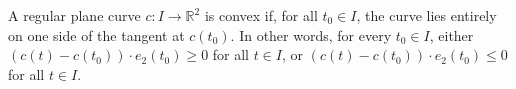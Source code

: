 A regular plane curve $c: I \to \mathbb{R}^2$ is convex if, for all $t_0 \in I$, the curve lies entirely on one side of the tangent at $c(t_0)$. In other words, for every $t_0 \in I$, either $(c(t) - c(t_0)) \cdot e_2(t_0) \geq 0$ for all $t \in I$, or $(c(t) - c(t_0)) \cdot e_2(t_0) \leq 0$ for all $t \in I$.